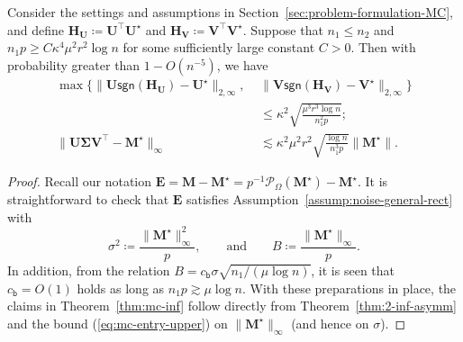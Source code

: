 \begin{theorem}
\label{thm:mc-inf}
%
Consider the settings and assumptions in Section~\ref{sec:problem-formulation-MC}, and
define $\bm{H}_{\bm{U}}\coloneqq\bm{U}^{\top}\bm{U}^{\star}$ and
$\bm{H}_{\bm{V}}\coloneqq\bm{V}^{\top}\bm{V}^{\star}$.
Suppose that $n_1\leq n_2$ and $n_{1}p\geq C\kappa^{4}\mu^{2}r^{2}\log n$ for some
sufficiently large constant $C>0$. Then with probability greater
than $1-O(n^{-5})$, we have
%
\begin{subequations}
%
\begin{align}
\max\{\|\bm{U}\mathsf{sgn}(\bm{H}_{\bm{U}})-\bm{U}^{\star}\|_{2,\infty},\,\,&\|\bm{V}\mathsf{sgn}(\bm{H}_{\bm{V}})-\bm{V}^{\star}\|_{2,\infty}\} \nonumber\\& \leq\kappa^{2}\sqrt{\frac{\mu^{3}r^{3}\log n}{n_{1}^{2}p}};
\label{eq:mc-inf-claim-1}\\
\|\bm{U}\bm{\Sigma}\bm{V}^{\top}-\bm{M}^{\star}\|_{\infty} & \lesssim\kappa^{2}\mu^{2}r^{2}\sqrt{\frac{\log n}{n_{1}^{3}p}}\|\bm{M}^{\star}\|.
\label{eq:mc-inf-claim-2}
\end{align}
%
\end{subequations}
%
\end{theorem}
%
\begin{proof}
	Recall our notation $\bm{E}= \bm{M}  -\bm{M}^{\star}= p^{-1}\mathcal{P}_{\Omega}(\bm{M}^{\star})-\bm{M}^{\star}$.
 It is straightforward to check
that $\bm{E}$ satisfies Assumption~\ref{assump:noise-general-rect} with
%
\begin{equation}
\sigma^{2}\coloneqq\frac{\|\bm{M}^{\star}\|_{\infty}^{2}}{p},\qquad\text{and}\qquad B\coloneqq\frac{\|\bm{M}^{\star}\|_{\infty}}{p}. \label{eq:mc-inf-noise}
\end{equation}
%
In addition, from the relation $B= c_{\mathsf{b}}\sigma\sqrt{n_1/({\mu}\log n)}$, it is seen that $c_{\mathsf{b}}= O(1)$
holds as long as $n_{1}p\gtrsim\mu\log n$.
With these preparations in place, the claims in Theorem~\ref{thm:mc-inf} follow
directly from Theorem~\ref{thm:2-inf-asymm} and the bound (\ref{eq:mc-entry-upper}) on $\|\bm{M}^{\star}\|_{\infty}$
(and hence on $\sigma$).
%
\end{proof}

